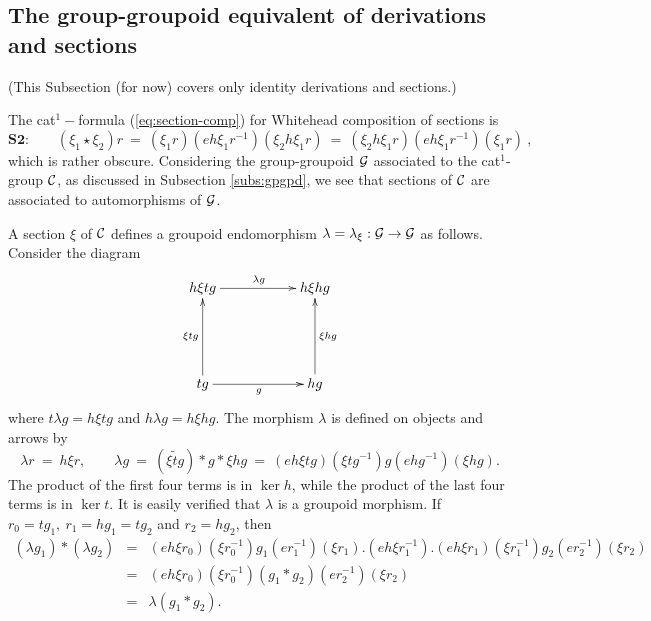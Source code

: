 \subsection{The group-groupoid equivalent of derivations and sections}
\label{subs:gpd-sect}

(This Subsection (for now) covers only identity derivations and sections.) 

\medskip\noindent 
The cat$^1-$formula (\ref{eq:section-comp}) 
for Whitehead composition of sections is 
$$ 
\textbf{S2:} \qquad
(\xi_1 \star \xi_2)r
 ~=~ (\xi_1 r)(e h \xi_1 r^{-1})(\xi_2 h \xi_1 r)
 ~=~ (\xi_2 h \xi_1 r)(eh \xi_1 r^{-1})(\xi_1 r)~,
$$
which is rather obscure.  
Considering the group-groupoid $\mathcal{G}$ 
associated to the cat$^1$-group $\mathcal{C}$, 
as discussed in Subsection \ref{subs:gpgpd}, 
we see that sections of $\mathcal{C}$ are associated to automorphisms of $\mathcal{G}$.

\bigskip\noindent
A section $\xi$ of $\mathcal{C}$ defines a groupoid endomorphism 
$\lambda = \lambda_{\xi} : \mathcal{G} \to \mathcal{G}$ 
as follows.  Consider the diagram
\begin{equation} \label{eq:gpd-section}
\vcenter{\xymatrix{ 
  h\xi tg \ar[rr]^{\lambda g} 
     && h\xi hg  \\
     &&  \\
  tg \ar[rr]_{g} \ar[uu]^{\xi tg}
     && hg \ar[uu]_{\xi hg}
}}
\end{equation}
where $t \lambda g = h\xi tg$ and $h \lambda g = h\xi hg$.
The morphism $\lambda$ is defined on objects and arrows by 
\begin{equation} \label{eq:def_lambda}
\lambda r ~=~ h\xi r, \quad\quad 
\lambda g ~=~ (\widetilde{\xi t g}) * g * \xi h g
~=~ (eh\xi tg)(\xi tg^{-1})g(ehg^{-1})(\xi hg). 
\end{equation}
The product of the first four terms is in $\ker h$, 
while the product of the last four terms is in $\ker t$. 
It is easily verified that $\lambda$ is a groupoid morphism. 
If $r_0 = tg_1,~ r_1 = hg_1 = tg_2$ and $r_2 = hg_2$, then
\begin{eqnarray*}
(\lambda g_1) * (\lambda g_2)
& = & (eh\xi r_0)(\xi r_0^{-1})g_1(er_1^{-1})(\xi r_1)
      .(eh\xi r_1^{-1})
      .(eh\xi r_1)(\xi r_1^{-1})g_2(er_2^{-1})(\xi r_2) \\
& = & (eh\xi r_0)(\xi r_0^{-1})(g_1 * g_2)(er_2^{-1})(\xi r_2) \\
& = & \lambda(g_1 * g_2). 
\end{eqnarray*}

